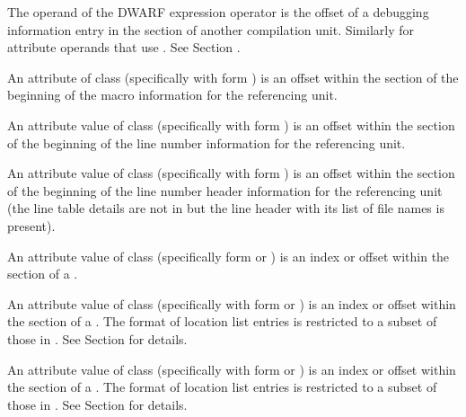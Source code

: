 \begin{description}
The operand of the \DWOPcallref{} DWARF expression 
operator is the offset of a debugging 
information entry in the \dotdebuginfodwo{} section of 
another compilation unit.  Similarly for attribute 
operands that use \DWFORMrefaddr. 
See Section .

An attribute of class \CLASSmacptr{} (specifically \DWATmacros{} 
with form \DWFORMsecoffset{}) is an offset within the 
\dotdebugmacrodwo{} section of the beginning of the macro 
information for the referencing unit.

An attribute value of class \CLASSlineptr{} (specifically 
\DWATstmtlist{} with form \DWFORMsecoffset) 
is an offset within the \dotdebugline{} section of the 
beginning of the line number information for the 
referencing unit.

An attribute value of class \CLASSlineptr{} (specifically  
\DWATstmtlist{}  with form \DWFORMsecoffset) 
is an offset within the \dotdebuglinedwo{} section of the 
beginning of the line number header information 
for the referencing unit (the line table details are not in 
\dotdebuglinedwo{} but the line header with its list 
of file names is present).


\bb
{}
An attribute value of class \CLASSrnglist{} 
(specifically form \DWFORMrnglistx{} or \DWFORMsecoffset) 
is an index or offset within the \dotdebugrnglists{} 
section of a .
\eb

An attribute value of class \CLASSrnglist{} (specifically 
\DWATranges{} with form \DWFORMrnglistx{} or \DWFORMsecoffset) 
is an index or offset within the \dotdebugrnglistsdwo{}
section of a .
The format of \dotdebugrnglistsdwo{} location list entries 
is restricted to a subset of those in \dotdebugrnglists.
See Section  for details.

An attribute value of class 
\CLASSloclist{} (specifically with form \DWFORMloclistx{}
or \DWFORMsecoffset) 
is an index or offset within the \dotdebugloclistsdwo{} 
section of a .
The format of \dotdebugloclistsdwo{} location list entries 
is restricted to a subset of those in \dotdebugloclists.
See Section  for details.


\end{description}
